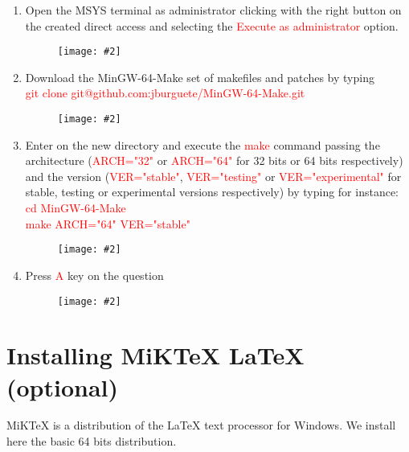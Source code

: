 \documentclass[a4paper]{article}
\newcommand{\FIG}[2]
{
	\begin{figure}[ht!]
	\centering
	\texttt{[image: \#2]}
	\end{figure}
}
\newcommand{\FIGURE}[1]{\FIG{0.35}{#1}}
\newcommand{\RED}[1] {\textcolor{red}{#1}}
\begin{document}
\begin{enumerate}

\clearpage

\item Open the MSYS terminal as administrator clicking with the right button on
the created direct access and selecting the \RED{Execute as administrator}
option.
\FIGURE{mingw-1.png}

\item Download the MinGW-64-Make set of makefiles and patches by typing\\
\RED{git clone git@github.com:jburguete/MinGW-64-Make.git}
\FIGURE{mingw-2.png}

\clearpage

\item Enter on the new directory and execute the \RED{make} command passing the
architecture (\RED{ARCH="32"} or \RED{ARCH="64"} for 32 bits or 64 bits
respectively) and the version (\RED{VER="stable"}, \RED{VER="testing"} or
\newline\RED{VER="experimental"} for stable, testing or experimental versions
respectively) by typing for instance:\\
\RED{cd MinGW-64-Make}\\
\RED{make ARCH="64" VER="stable"}
\FIGURE{mingw-3.png}

\item Press \RED{A} key on the question
\FIGURE{mingw-4.png}

\end{enumerate}

\clearpage

\section{Installing MiKTeX LaTeX (optional)}

MiKTeX is a distribution of the LaTeX text processor for Windows. We install
here the basic 64 bits distribution.
\end{document}
